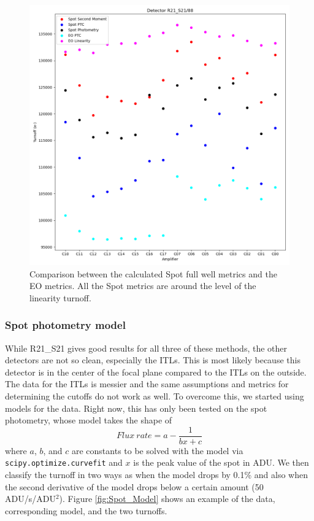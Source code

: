\begin{figure}[ht]
    \centering
    \includegraphics[width=0.95\linewidth]{figures/Spot_EO_Comparison.png}
    \caption{Comparison between the calculated Spot full well metrics and the EO metrics. All the Spot metrics are around the level of the linearity turnoff.}
    \label{fig:Spot_vs_EO_Metrics}
\end{figure}

\subsubsection{Spot photometry model}

While R21\_S21 gives good results for all three of these methods, the other detectors are not so clean, especially the ITLs. This is most likely because this detector is in the center of the focal plane compared to the ITLs on the outside. 
The data for the ITLs is messier and the same assumptions and metrics for determining the cutoffs do not work as well. To overcome this, we started using models for the data. Right now, this has only been tested on the spot photometry, whose model takes the shape of
\begin{equation*}
    Flux \ rate=a-\frac{1}{bx+c}
\end{equation*}
where $a$, $b$, and $c$ are constants to be solved with the model via \texttt{scipy.optimize.curvefit} and $x$ is the peak value of the spot in ADU. We then classify the turnoff in two ways as when the model drops by 0.1\% and also when the second derivative of the model drops below a certain amount (50 ADU/s/ADU$^{2}$). Figure \ref{fig:Spot_Model} shows an example of the data, corresponding model, and the two turnoffs.

